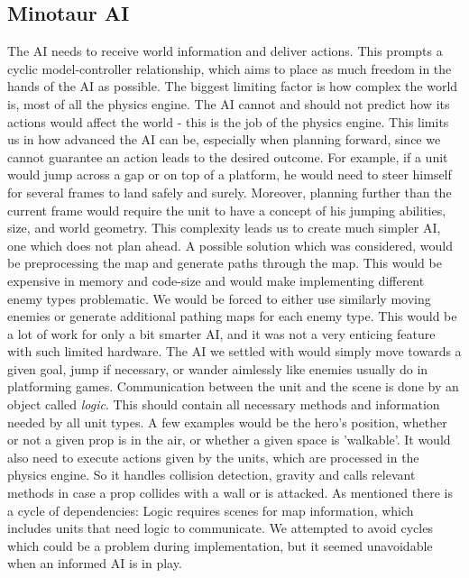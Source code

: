 \subsection*{Minotaur AI} %
The AI needs to receive world information and deliver actions. This prompts a cyclic model-controller relationship, which aims to place as much freedom in the hands of the AI as possible. The biggest limiting factor is how complex the world is, most of all the physics engine. The AI cannot and should not predict how its actions would affect the world - this is the job of the physics engine. This limits us in how advanced the AI can be, especially when planning forward, since we cannot guarantee an action leads to the desired outcome. For example, if a unit would jump across a gap or on top of a platform, he would need to steer himself for several frames to land safely and surely. Moreover, planning further than the current frame would require the unit to have a concept of his jumping abilities, size, and world geometry.
\newline
This complexity leads us to create much simpler AI, one which does not plan ahead. A possible solution which was considered, would be preprocessing the map and generate paths through the map. This would be expensive in memory and code-size and would make implementing different enemy types problematic. We would be forced to either use similarly moving enemies or generate additional pathing maps for each enemy type. This would be a lot of work for only a bit smarter AI, and it was not a very enticing feature with such limited hardware.
\newline
The AI we settled with would simply move towards a given goal, jump if necessary, or wander aimlessly like enemies usually do in platforming games.
\newline
Communication between the unit and the scene is done by an object called \emph{logic}. This should contain all necessary methods and information needed by all unit types. A few examples would be the hero's position, whether or not a given prop is in the air, or whether a given space is 'walkable'. It would also need to execute actions given by the units, which are processed in the physics engine. So it handles collision detection, gravity and calls relevant methods in case a prop collides with a wall or is attacked.
\newline
As mentioned there is a cycle of dependencies: Logic requires scenes for map information, which includes units that need logic to communicate. We attempted to avoid cycles which could be a problem during implementation, but it seemed unavoidable when an informed AI is in play.

